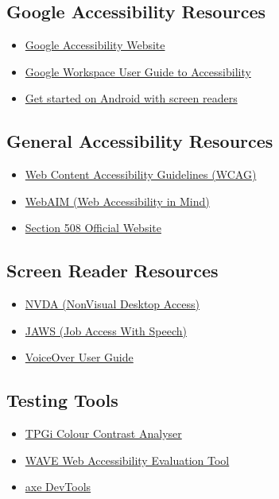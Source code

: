 \subsection{Google Accessibility Resources}\label{ch15:ssec:google-resources}
\begin{itemize}
	\item \href{https://www.google.com/accessibility/}{Google Accessibility Website}
	\item \href{https://support.google.com/a/users/answer/9322387}{Google Workspace User Guide to Accessibility}
	\item \href{https://support.google.com/accessibility/android/answer/6378524}{Get started on Android with screen readers}
\end{itemize}

\subsection{General Accessibility Resources}\label{ch15:ssec:general-resources}
\begin{itemize}
	\item \href{https://www.w3.org/WAI/standards-guidelines/wcag/}{Web Content Accessibility Guidelines (WCAG)}
	\item \href{https://webaim.org/}{WebAIM (Web Accessibility in Mind)}
	\item \href{https://www.section508.gov/}{Section 508 Official Website}
\end{itemize}

\subsection{Screen Reader Resources}\label{ch15:ssec:sr-resources}
\begin{itemize}
	\item \href{https://www.nvaccess.org/}{NVDA (NonVisual Desktop Access)}
	\item \href{https://www.freedomscientific.com/products/software/jaws/}{JAWS (Job Access With Speech)}
	\item \href{https://www.apple.com/voiceover/info/guide/_1121.html}{VoiceOver User Guide}
\end{itemize}

\subsection{Testing Tools}\label{ch15:ssec:testing-tools}
\begin{itemize}
	\item \href{https://www.tpgi.com/color-contrast-checker/}{TPGi Colour Contrast Analyser}
	\item \href{https://wave.webaim.org/}{WAVE Web Accessibility Evaluation Tool}
	\item \href{https://www.deque.com/axe/}{axe DevTools}
\end{itemize}

